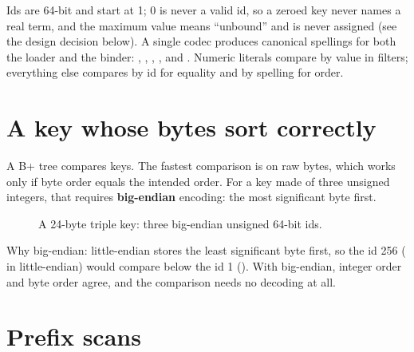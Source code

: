 \begin{ontodb}
Ids are 64-bit and start at 1; 0 is never a valid id, so a zeroed key never
names a real term, and the maximum value means ``unbound'' and is never
assigned (see the design decision below). A single codec
produces canonical spellings for both the loader and the binder: ,
, , , and .
Numeric literals compare by value in filters; everything else compares by id
for equality and by spelling for order.
\end{ontodb}

\section{A key whose bytes sort correctly}

A B+ tree compares keys. The fastest comparison is  on raw bytes,
which works only if byte order equals the intended order. For a key made of
three unsigned integers, that requires \textbf{big-endian} encoding: the most
significant byte first.

\begin{figure}[ht]
\centering
{}
\caption{A 24-byte triple key: three big-endian unsigned 64-bit ids.}
\label{fig:key}
\end{figure}

Why big-endian: little-endian stores the least significant byte first, so the
id 256 ( in little-endian) would compare below the id 1
(). With big-endian, integer order and byte order agree,
and the comparison needs no decoding at all.

\section{Prefix scans}

